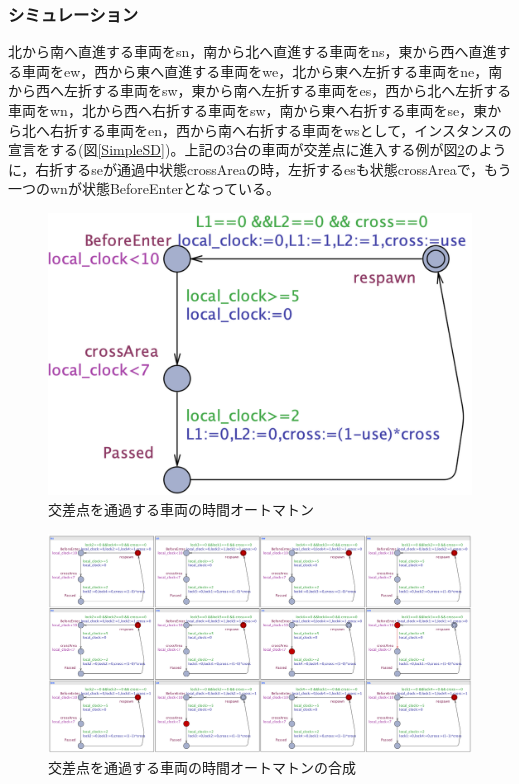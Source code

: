 \documentclass{tpu-sotu}
\begin{document}
	\subsubsection{シミュレーション}
	北から南へ直進する車両をsn，南から北へ直進する車両をns，東から西へ直進する車両をew，西から東へ直進する車両をwe，北から東へ左折する車両をne，南から西へ左折する車両をsw，東から南へ左折する車両をes，西から北へ左折する車両をwn，北から西へ右折する車両をsw，南から東へ右折する車両をse，東から北へ右折する車両をen，西から南へ右折する車両をwsとして，インスタンスの宣言をする(図\ref{SimpleSD})。上記の3台の車両が交差点に進入する例が図\ref{SimpleS}のように，右折するseが通過中状態crossAreaの時，左折するesも状態crossAreaで，もう一つのwnが状態BeforeEnterとなっている。
	\begin{figure}[htbp]
	\centering
	\includegraphics[width=115mm]{SimpleIntersection.png}
	\caption{交差点を通過する車両の時間オートマトン}
	\label{Simple}
	\end{figure}
	\begin{figure}[htbp]
	\centering
	\includegraphics[width=150mm]{SimpleIntersectionSimu.png}
	\caption{交差点を通過する車両の時間オートマトンの合成}
	\label{SimpleS}
	\end{figure}
\end{document}
